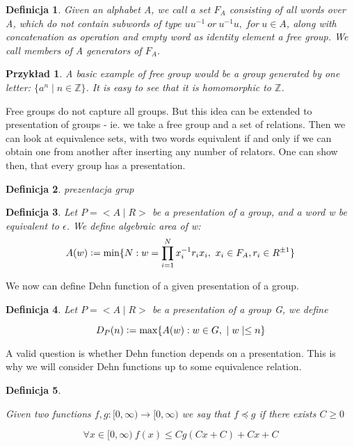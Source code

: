 \documentclass[licencjacka]{pracamgr}
\newcommand{\defeq}{\vcentcolon=}
\newtheorem{defi}{Definicja}[section]
\newtheorem{exampl}{Przykład}[section]
\begin{document}
\begin{defi}\label{free group}
Given an alphabet A, we call a set $F_A$ consisting of all words over A, which do not contain subwords of type $uu^{-1}\ or \ u^{-1}u, \ for \ u \in A$, along with concatenation as operation and empty word as identity element a \emph{free group}. We call members of A \textit{generators} of $F_A$.
\end{defi}

\begin{exampl}\label{free group}
A basic example of free group would be a group generated by one letter: $\{ a^{n} \mid n \in \mathbb{Z} \}$. It is easy to see that it is homomorphic to $\mathbb{Z}$.
\end{exampl}

Free groups do not capture all groups. But this idea can be extended to presentation of groups - ie. we take a free group and a set of relations. Then we can look at equivalence sets, with two words equivalent if and only if we can obtain one from another after inserting any number of relators. One can show then, that every group has a presentation.

\begin{defi}\label{presentation of group}
prezentacja grup
\end{defi}

\begin{defi}\label{Algebraic area}
Let $P = <A \mid R>$ be a presentation of a group, and a word w be equivalent to $\epsilon$. We define algebraic area of w:
\[ A(w) \defeq \min \{ N : w = \prod_{i=1}^{N} x_{i}^{-1}r_{i}x_{i}, \  x_{i} \in F_{A}, r_{i} \in R^{\pm 1} \} \]
\end{defi}

We now can define Dehn function of a given presentation of a group.

\begin{defi}\label{Dehn function}
Let $P = <A \mid R>$ be a presentation of a group G, we define

\[ D_{P}(n) \defeq \max \{ A(w) : w \in G, \ \mid w \mid \leq n \} \]

\end{defi}

A valid question is whether Dehn function depends on a presentation. This is why we will consider Dehn functions up to some equivalence relation.

\begin{defi}\label{order relation}

Given two functions $f, g : [0, \infty) \rightarrow [0, \infty) $ we say that $f \preceq g$ if there exists $C \ge 0$

\[ \forall x \in [0, \infty) \  f(x) \leq C g(Cx+C) + Cx + C  \]

\end{defi}
\end{document}
